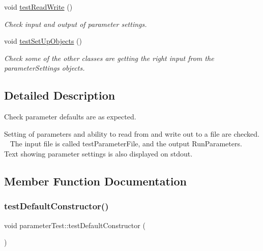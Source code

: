 \begin{DoxyCompactItemize}
void \mbox{\hyperlink{classparameterTest_a73ffa897b723095fdb3f06cc309575d6}{test\+Read\+Write}} ()
\begin{DoxyCompactList}\small\item\em Check input and output of parameter settings. \end{DoxyCompactList}\item 
void \mbox{\hyperlink{classparameterTest_aeb4d3a1620defdc974a9b925f4c1cd9f}{test\+Set\+Up\+Objects}} ()
\begin{DoxyCompactList}\small\item\em Check some of the other classes are getting the right input from the parameter\+Settings objects. \end{DoxyCompactList}\end{DoxyCompactItemize}


\subsection{Detailed Description}
Check parameter defaults are as expected. 

Setting of parameters and ability to read from and write out to a file are checked. ~\newline
The input file is called test\+Parameter\+File, and the output Run\+Parameters.~\newline
Text showing parameter settings is also displayed on stdout. 

\subsection{Member Function Documentation}
\mbox{\label{classparameterTest_a80bc49c4dafb3b6ae5c7e561b5711583}} 
\subsubsection{\texorpdfstring{test\+Default\+Constructor()}{testDefaultConstructor()}}
{\footnotesize\ttfamily void parameter\+Test\+::test\+Default\+Constructor (\begin{DoxyParamCaption}{ }\end{DoxyParamCaption})\hspace{0.3cm}{\ttfamily [inline]}}



